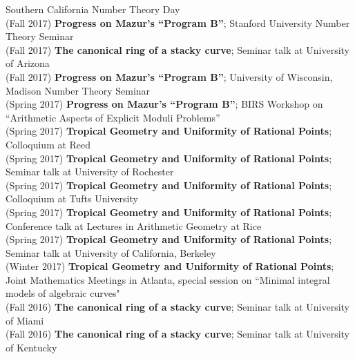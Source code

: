 \documentclass[margin,line]{res}
\begin{document}
\begin{resume}
Southern California Number Theory Day
\vspace{.05cm}\\
(Fall 2017) \textbf{Progress on Mazur's ``Program B''};  
Stanford University Number Theory Seminar
\vspace{.05cm}\\
(Fall 2017) \textbf{The canonical ring of a stacky curve};  
Seminar talk at University of Arizona
\vspace{.05cm}\\
(Fall 2017) \textbf{Progress on Mazur's ``Program B''};  
University of Wisconsin, Madison Number Theory Seminar
\vspace{.05cm}\\
(Spring 2017) \textbf{Progress on Mazur's ``Program B''};  
BIRS Workshop on ``Arithmetic Aspects of Explicit Moduli Problems''
\vspace{.05cm}\\
(Spring 2017) \textbf{Tropical Geometry and Uniformity of Rational Points};
Colloquium at Reed 
\vspace{.05cm}\\
(Spring 2017) \textbf{Tropical Geometry and Uniformity of Rational Points};
Seminar talk at University of Rochester
\vspace{.05cm}\\
(Spring 2017) \textbf{Tropical Geometry and Uniformity of Rational Points};
Colloquium at Tufts University 
\vspace{.05cm}\\
(Spring 2017) \textbf{Tropical Geometry and Uniformity of Rational Points};
Conference talk at Lectures in Arithmetic Geometry at Rice
\vspace{.05cm}\\
(Spring 2017) \textbf{Tropical Geometry and Uniformity of Rational Points};
Seminar talk at University of California, Berkeley
\vspace{.05cm}\\
(Winter 2017) \textbf{Tropical Geometry and Uniformity of Rational Points};
Joint Mathematics Meetings in Atlanta, special session on ``Minimal integral models of algebraic curves"  
\vspace{.05cm}\\
(Fall 2016) \textbf{The canonical ring of a stacky curve};  
Seminar talk at University of Miami
\vspace{.05cm}\\
(Fall 2016) \textbf{The canonical ring of a stacky curve};  
Seminar talk at University of Kentucky

\end{resume}
\end{document}
